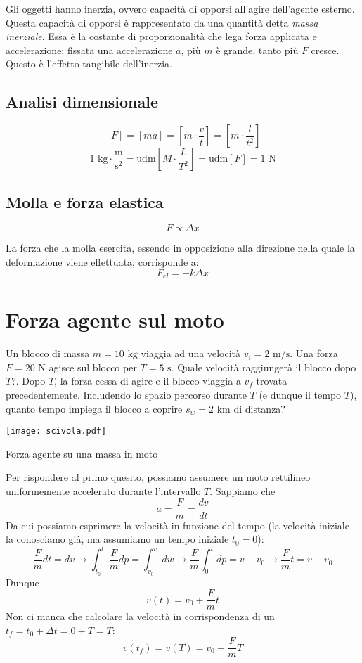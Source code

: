 \noindent Gli oggetti hanno inerzia, ovvero capacità di opporsi all'agire dell'agente
esterno. Questa capacità di opporsi è rappresentato da una quantità detta
\textit{massa inerziale}. Essa è la costante di proporzionalità che lega forza applicata
e accelerazione: fissata una accelerazione $a$, più $m$ è grande, tanto più $F$ cresce.
Questo è l'effetto tangibile dell'inerzia.

\subsection{Analisi dimensionale}
\[ [F] = [ma] = \left[m\cdot\frac{v}{t}\right] = \left[m\cdot\frac{l}{t^2}\right]  \]
\[ 1\text{ kg}\cdot\frac{\text{m}}{\text{s}^2} = \text{udm}\left[M\cdot\frac{L}{T^2}\right] = \text{udm}[F] = 1\text{ N} \]


\subsection{Molla e forza elastica}
\[ F \propto \Delta x \]

La forza che la molla esercita, essendo in opposizione alla direzione nella
quale la deformazione viene effettuata, corrisponde a:
\[ F_\textit{el} = -k\Delta x \]

\section{Forza agente sul moto}
Un blocco di massa $m = 10 \text{ kg}$ viaggia ad una velocità $v_i =
2 \text{ m/s}$. Una forza $F = 20 \text{ N}$ agisce sul blocco per
$T = 5 \text{ s}$. Quale velocità raggiungerà il blocco dopo $T$?.
Dopo $T$, la forza cessa di agire e il blocco viaggia a $v_f$ trovata
precedentemente. Includendo lo spazio percorso durante $T$ (e dunque il
tempo $T$), quanto tempo impiega il blocco a coprire $s_w = 2\text{ km}$
di distanza?

\begin{marginfigure}
    \centering
    \texttt{[image: scivola.pdf]}
    \caption{Forza agente su una massa in moto}
\end{marginfigure}

Per rispondere al primo quesito, possiamo assumere un moto rettilineo
uniformemente accelerato durante l'intervallo $T$. Sappiamo che \[ a = \frac{F}{m} = \frac{dv}{dt} \]
Da cui possiamo esprimere la velocità in funzione del tempo (la velocità
iniziale la conosciamo già, ma assumiamo un tempo iniziale $t_0 = 0$):
\[ \frac{F}{m}dt = dv \to \int_{t_0}^{t}\frac{F}{m}dp = \int_{v_0}^{v}dw \to \frac{F}{m}\int_{0}^{t}dp = v - v_0 \to \frac{F}{m}t = v - v_0 \]
Dunque
\[ v(t) = v_0 + \frac{F}{m}t \]
Non ci manca che calcolare la velocità in corrispondenza di un $t_f = t_0 + \Delta t = 0 + T = T$:
\[ v(t_f) = v(T) = v_0 + \frac{F}{m}T \]

